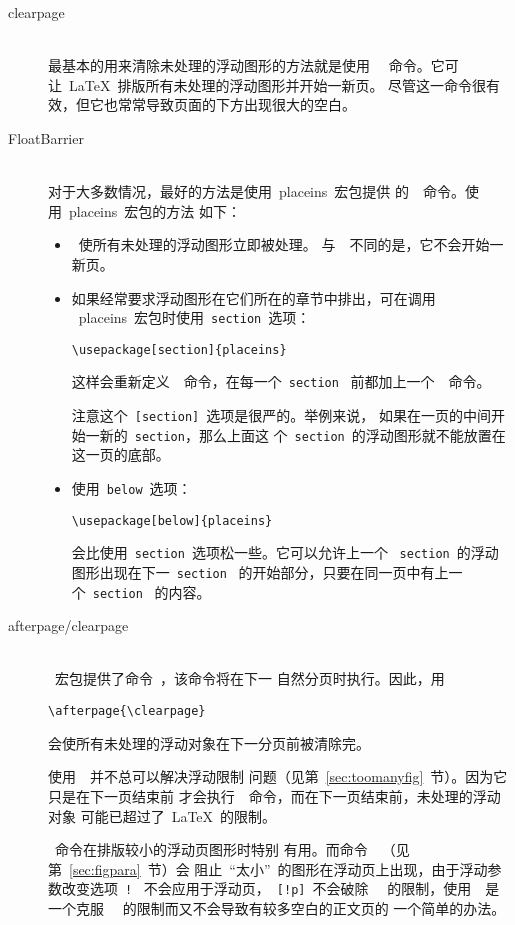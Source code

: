 \begin{description}
	\item [clearpage] \mbox{} \\
	最基本的用来清除未处理的浮动图形的方法就是使用~~
	命令。它可让~\LaTeX{}~排版所有未处理的浮动图形并开始一新页。
	尽管这一命令很有效，但它也常常导致页面的下方出现很大的空白。
	\item [FloatBarrier] \mbox{} \\
	对于大多数情况，最好的方法是使用~\textsf{placeins}~宏包提供
	的~~命令。使用~\textsf{placeins}~宏包的方法
	如下：
	\begin{itemize}
		\item {}~使所有未处理的浮动图形立即被处理。
		与~~不同的是，它不会开始一新页。
		\item 如果经常要求浮动图形在它们所在的章节中排出，可在调用
		~\textsf{placeins}~宏包时使用~\texttt{section}~选项：
		\begin{Verbatim}[xleftmargin=1cm]
		\usepackage[section]{placeins}
		\end{Verbatim}
		这样会重新定义~~命令，在每一个~\texttt{section}~
		前都加上一个~~命令。
		
		注意这个~\texttt{[section]}~选项是很严的。举例来说，
		如果在一页的中间开始一新的~\texttt{section}，那么上面这
		个~\texttt{section}~的浮动图形就不能放置在这一页的底部。
		\item 使用~\texttt{below}~选项：
		\begin{Verbatim}[xleftmargin=1cm]
		\usepackage[below]{placeins}
		\end{Verbatim}
		会比使用~\texttt{section}~选项松一些。它可以允许上一个
		~\texttt{section}~的浮动图形出现在下一~\texttt{section}~
		的开始部分，只要在同一页中有上一个~\texttt{section}~
		的内容。
	\end{itemize}
	\item [afterpage/clearpage] \mbox{} \\
	~宏包提供了命令~，该命令将在下一
	自然分页时执行。因此，用
	\begin{Verbatim}[xleftmargin=1cm]
	\afterpage{\clearpage}
	\end{Verbatim}
	会使所有未处理的浮动对象在下一分页前被清除完。
	
	使用~~并不总可以解决浮动限制
	问题（见第~\ref{sec:toomanyfig}~节）。因为它只是在下一页结束前
	才会执行~~命令，而在下一页结束前，未处理的浮动对象
	可能已超过了~\LaTeX{}~的限制。
	
	~命令在排版较小的浮动页图形时特别
	有用。而命令~~（见第~\ref{sec:figpara}~节）会
	阻止~``太小''~的图形在浮动页上出现，由于浮动参数改变选项~\texttt{!}~
	不会应用于浮动页，~\texttt{[!p]}~不会破除~~
	的限制，使用~~是一个克服
	~~的限制而又不会导致有较多空白的正文页的
	一个简单的办法。
\end{description}

